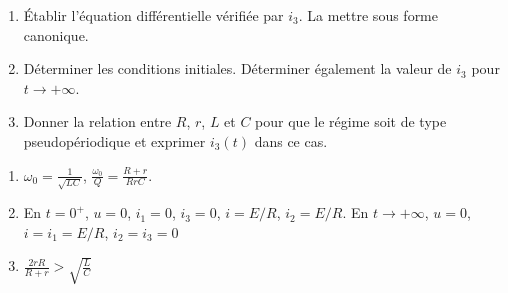 \begin{enumerate}
	\item Établir l'équation différentielle vérifiée par $i_3$. La mettre sous forme canonique.
	\item Déterminer les conditions initiales. Déterminer également la valeur de $i_3$ pour $t\rightarrow+\infty$.
	\item Donner la relation entre $R$, $r$, $L$ et $C$ pour que le régime soit de type pseudopériodique et exprimer $i_3(t)$ dans ce cas.
\end{enumerate}

\begin{enumerate}
	\item $\omega_0 = \frac{1}{\sqrt{LC}}$, $\frac{\omega_0}{Q} = \frac{R + r}{RrC}$.
	\item En $t=0^+$, $u=0$, $i_1=0$, $i_3=0$, $i=E/R$, $i_2=E/R$. En $t\rightarrow+\infty$, $u=0$, $i=i_1=E/R$, $i_2=i_3=0$
	\item $\frac{2rR}{R+r} > \sqrt{\frac{L}{C}}$
\end{enumerate}

